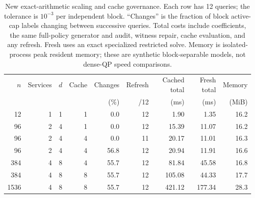 \begin{table}[t]\centering\small
\caption{New exact-arithmetic scaling and cache governance. Each row has 12 queries; the tolerance is $10^{-3}$ per independent block. ``Changes'' is the fraction of block active-cap labels changing between successive queries. Total costs include coefficients, the same full-policy generator and audit, witness repair, cache evaluation, and any refresh. Fresh uses an exact specialized restricted solve. Memory is isolated-process peak resident memory; these are synthetic block-separable models, not dense-QP speed comparisons.}\label{tab:r28-scaling}
\begin{tabular}{rrrrrrrrr}\toprule
$n$ & Services & $d$ & Cache & Changes & Refresh & Cached total & Fresh total & Memory\\
 & & & & (\%) & /12 & (ms) & (ms) & (MiB)\\\midrule
12 & 1 & 1 & 1 & 0.0 & 12 & 1.90 & 1.35 & 16.2 \\
96 & 2 & 4 & 1 & 0.0 & 12 & 15.39 & 11.07 & 16.2 \\
96 & 2 & 4 & 4 & 0.0 & 11 & 20.17 & 11.01 & 16.3 \\
96 & 2 & 4 & 4 & 56.8 & 12 & 20.94 & 11.91 & 16.6 \\
384 & 4 & 8 & 4 & 55.7 & 12 & 81.84 & 45.58 & 16.8 \\
384 & 4 & 8 & 8 & 55.7 & 12 & 105.08 & 44.33 & 17.7 \\
1536 & 4 & 8 & 8 & 55.7 & 12 & 421.12 & 177.34 & 28.3 \\
\bottomrule\end{tabular}
\end{table}
